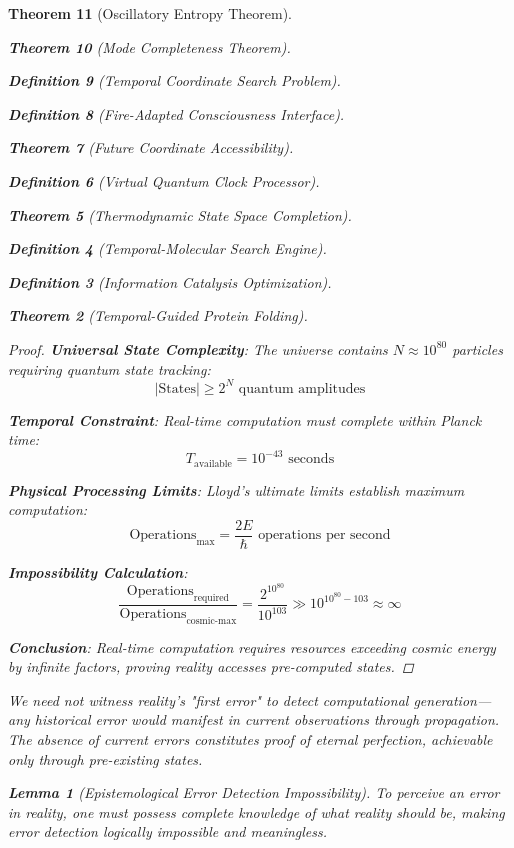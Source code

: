 \documentclass[12pt,a4paper]{article}
\newtheorem{theorem}{Theorem}[section]
\newtheorem{lemma}[theorem]{Lemma}
\newtheorem{definition}[theorem]{Definition}
\begin{document}
\begin{theorem}[Oscillatory Entropy Theorem]
\begin{theorem}[Mode Completeness Theorem]
\begin{enumerate}
\begin{definition}[Temporal Coordinate Search Problem]
\begin{algorithm}
\begin{definition}[Fire-Adapted Consciousness Interface]
\begin{theorem}[Future Coordinate Accessibility]
\begin{definition}[Virtual Quantum Clock Processor]
\begin{itemize}
\begin{itemize}
\begin{theorem}[Thermodynamic State Space Completion]
\begin{definition}[Temporal-Molecular Search Engine]
\begin{definition}[Information Catalysis Optimization]
\begin{algorithm}
\begin{theorem}[Temporal-Guided Protein Folding]
\begin{table}[h]
\begin{proof}
\textbf{Universal State Complexity}: The universe contains $N \approx 10^{80}$ particles requiring quantum state tracking:
$$|\text{States}| \geq 2^N \text{ quantum amplitudes}$$

\textbf{Temporal Constraint}: Real-time computation must complete within Planck time:
$$T_{\text{available}} = 10^{-43} \text{ seconds}$$

\textbf{Physical Processing Limits}: Lloyd's ultimate limits establish maximum computation:
$$\text{Operations}_{\text{max}} = \frac{2E}{\hbar} \text{ operations per second}$$

\textbf{Impossibility Calculation}:
$$\frac{\text{Operations}_{\text{required}}}{\text{Operations}_{\text{cosmic-max}}} = \frac{2^{10^{80}}}{10^{103}} \gg 10^{10^{80}-103} \approx \infty$$

\textbf{Conclusion}: Real-time computation requires resources exceeding cosmic energy by infinite factors, proving reality accesses pre-computed states.
\end{proof}

\begin{remark}
We need not witness reality's "first error" to detect computational generation—any historical error would manifest in current observations through propagation. The absence of current errors constitutes proof of eternal perfection, achievable only through pre-existing states.
\end{remark}

\begin{lemma}[Epistemological Error Detection Impossibility]
To perceive an error in reality, one must possess complete knowledge of what reality should be, making error detection logically impossible and meaningless.
\end{lemma}


\end{table}
\end{theorem}
\end{algorithm}
\end{definition}
\end{definition}
\end{theorem}
\end{itemize}
\end{itemize}
\end{definition}
\end{theorem}
\end{definition}
\end{algorithm}
\end{definition}
\end{enumerate}
\end{theorem}
\end{theorem}
\end{document}
